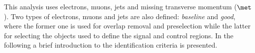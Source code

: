 This analysis uses electrons, muons, jets and missing transverse momentum
($\met$). Two types of electrons, muons and jets are also defined: \emph{baseline}
and \emph{good}, where the former one is used for overlap removal and
preselection while the latter for selecting the objects used to define the
signal and control regions. In the following a brief introduction to the
identification criteria is presented.
